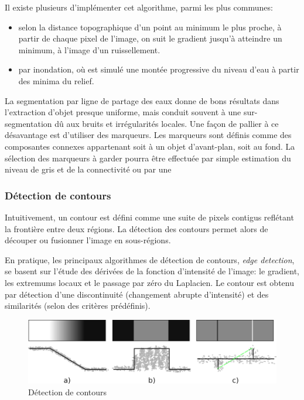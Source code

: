 \documentclass[a4paper,12pt]{report}
\begin{document}
Il existe plusieurs d'implémenter cet algorithme, parmi les plus communes: 
\begin{itemize}
\item selon la distance topographique d'un point au minimum le plus proche, à partir de chaque pixel de l'image, on suit le gradient jusqu'à atteindre un minimum, à l'image d'un ruissellement.
\item par inondation, où est simulé une montée progressive du niveau d'eau à partir des minima du relief.\\
\end{itemize}

La segmentation par ligne de partage des eaux donne de bons résultats dans l'extraction d'objet presque uniforme, mais conduit souvent à une sur-segmentation dû aux bruits et irrégularités locales. Une façon de pallier à ce désavantage est d'utiliser des marqueurs. Les marqueurs sont définis comme des composantes connexes appartenant soit à un objet d'avant-plan, soit au fond. La sélection des marqueurs à garder pourra être effectuée par simple estimation du niveau de gris et de la connectivité ou par une   


\subsubsection{Détection de contours}
Intuitivement, un contour est défini comme une suite de pixels contigus reflétant la frontière entre deux régions. 
La détection des contours permet alors de découper ou fusionner l'image en sous-régions.

En pratique, les principaux algorithmes de détection de contours, \textit{edge detection}, se basent sur l'étude des dérivées de la fonction d'intensité de l'image: le gradient, les extremums locaux et le passage par zéro du Laplacien. Le contour est obtenu par détection d'une discontinuité (changement abrupte d'intensité) et des similarités (selon des critères prédéfinis).\\

\begin{figure}[hbtp]
\centering
\includegraphics[scale=0.6]{figureDetectionDiscontinuities.png}
\caption{Détection de contours}
\label{fig:DetectionDiscontinuities}
\end{figure}
\end{document}
